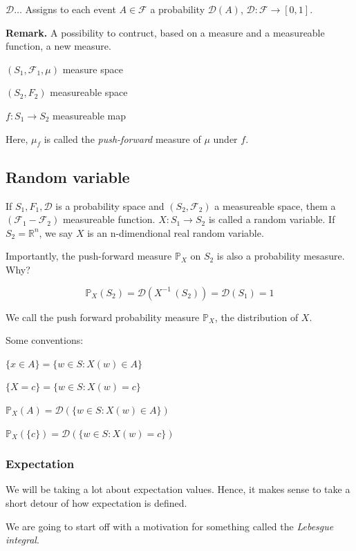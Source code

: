 \documentclass{scrarticle}
\begin{document}
$\mathcal{D}\ldots$ Assigns to each event $A \in \mathcal{F}$ a probability $\mathcal{D}(A)$, $\mathcal{D}: \mathcal{F} \to [0,1]$.

\textbf{Remark.} A possibility to contruct, based on a measure and a measureable function, a new measure.

$(S_1, \mathcal{F_1, \mu})$ measure space

$(S_2, F_2)$ measureable space

$f: S_1 \to S_2$ measureable map

Here, $\mu_f$ is called the \textit{push-forward} measure of $\mu$ under $f$.

\subsection{Random variable}

If $S_1, F_1, \mathcal{D}$ is a probability space and $(S_2, \mathcal{F}_2)$ a measureable space, them a $(\mathcal{F}_1 - \mathcal{F}_2)$ measureable function. $X: S_1 \to S_2$ is called a random variable. If $S_2 = \mathbb{R}^n$, we say $X$ is an n-dimendional real random variable. 

Importantly, the push-forward measure $\mathbb{P}_X$ on $S_2$ is also a probability mesasure. Why? 

\begin{equation}
    \mathbb{P}_X(S_2) = \mathcal{D}(X^{-1}\, (S_2)) = \mathcal{D}(S_1) = 1
\end{equation}

We call the push forward probability measure $\mathbb{P}_X$, the distribution of $X$.

Some conventions:

$\{x \in A\} = \{w \in S: X(w) \in A\}$

$\{X = c\} = \{w \in S: X(w) = c\}$

$\mathbb{P}_X(A) = \mathcal{D}(\{w \in S: X(w) \in A\})$

$\mathbb{P}_X(\{c\}) = \mathcal{D}(\{w \in S: X(w) = c\})$


\subsubsection{Expectation}

We will be taking a lot about expectation values. Hence, it makes sense to take a short detour of how expectation is defined. 

We are going to start off with a motivation for something called the \textit{Lebesgue integral}. 
\end{document}
